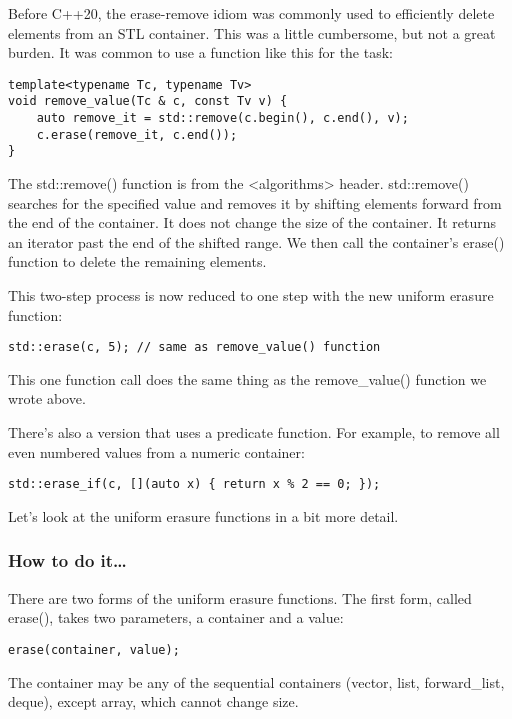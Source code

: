 
Before C++20, the erase-remove idiom was commonly used to efficiently delete elements from an STL container. This was a little cumbersome, but not a great burden. It was common to use a function like this for the task:

\begin{lstlisting}[style=styleCXX]
template<typename Tc, typename Tv>
void remove_value(Tc & c, const Tv v) {
	auto remove_it = std::remove(c.begin(), c.end(), v);
	c.erase(remove_it, c.end());
}
\end{lstlisting}

The std::remove() function is from the <algorithms> header. std::remove() searches for the specified value and removes it by shifting elements forward from the end of the container. It does not change the size of the container. It returns an iterator past the end of the shifted range. We then call the container's erase() function to delete the remaining elements.

This two-step process is now reduced to one step with the new uniform erasure function:

\begin{lstlisting}[style=styleCXX]
std::erase(c, 5); // same as remove_value() function
\end{lstlisting}

This one function call does the same thing as the remove\_value() function we wrote above.

There's also a version that uses a predicate function. For example, to remove all even numbered values from a numeric container:

\begin{lstlisting}[style=styleCXX]
std::erase_if(c, [](auto x) { return x % 2 == 0; });
\end{lstlisting}

Let's look at the uniform erasure functions in a bit more detail.

\subsubsection{How to do it…}

There are two forms of the uniform erasure functions. The first form, called erase(), takes two parameters, a container and a value:

\begin{lstlisting}[style=styleCXX]
erase(container, value);
\end{lstlisting}

The container may be any of the sequential containers (vector, list, forward\_list, deque), except array, which cannot change size.

